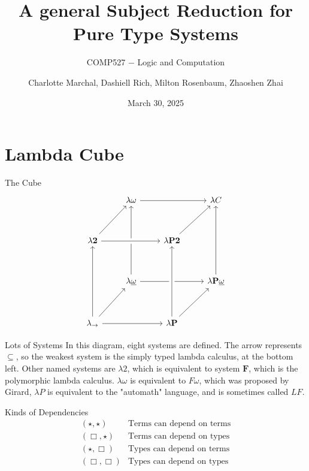 \documentclass{beamer}
\title{\normalsize{A general Subject Reduction for Pure Type Systems}\vspace{0.05in}}
\author{\small Charlotte Marchal, Dashiell Rich, Milton Rosenbaum, Zhaoshen Zhai}
\subtitle{\scriptsize{COMP527 $-$ Logic and Computation}}
\date{\footnotesize March 30, 2025}
\begin{document}
\frame{\titlepage}
    \section{Lambda Cube}

    \begin{frame}{The Cube}
        \[\begin{tikzcd}[ampersand replacement=\&, row sep=3.4em]
            \& \lambda\omega \arrow[rr] \arrow[from=dd] \&\& \lambda C \\
            \lambda \textbf{2} \arrow[ur] \arrow[rr, crossing over] \&\& \lambda \textbf{P2} \arrow[ur] \& \\
            \& \lambda\underline{\omega} \arrow[rr] \&\& \lambda\textbf{P} \underline{\omega} \arrow[uu] \\
            \lambda_\rightarrow \arrow[uu] \arrow[rr] \arrow[ur] \&\& \lambda \textbf{P} \arrow[ur] \arrow[uu, crossing over]
        \end{tikzcd}\]
    \end{frame}

    \begin{frame}{Lots of Systems}
        In this diagram, eight systems are defined. The arrow represents $\subseteq$, so the weakest system is the simply typed lambda calculus, at the bottom left. Other named systems are $\lambda 2$, which is equivalent to system $\textbf{F}$, which is the polymorphic lambda calculus. $\lambda\omega$ is equivalent to $F\omega$, which was proposed by Girard, $\lambda P$ is equivalent to the "automath" language, and is sometimes called $LF$.
    \end{frame}

    \begin{frame}{Kinds of Dependencies}
        \[\begin{array}{c|l}
            (\star, \star) & \text{Terms can depend on terms} \\
            (\Box, \star) & \text{Terms can depend on types} \\
            (\star, \Box) & \text{Types can depend on terms} \\
            (\Box, \Box) & \text{Types can depend on types} \\
        \end{array}\]
    \end{frame}
\end{document}
